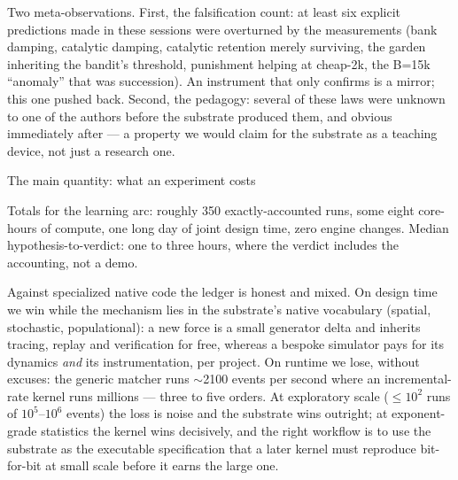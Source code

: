 Two meta-observations. First, the falsification count: at least six
explicit predictions made in these sessions were overturned by the
measurements (bank damping, catalytic damping, catalytic retention
merely surviving, the garden inheriting the bandit's threshold,
punishment helping at cheap-2k, the B=15k ``anomaly'' that was
succession). An instrument that only confirms is a mirror; this one
pushed back. Second, the pedagogy: several of these laws were
unknown to one of the authors before the substrate produced them,
and obvious immediately after --- a property we would claim for the
substrate as a teaching device, not just a research one.

\sec The main quantity: what an experiment costs

\medskip
\noindent{}
\medskip

Totals for the learning arc: roughly 350 exactly-accounted runs,
some eight core-hours of compute, one long day of joint design time,
zero engine changes. Median hypothesis-to-verdict: one to three
hours, where the verdict includes the accounting, not a demo.

Against specialized native code the ledger is honest and mixed. On
design time we win while the mechanism lies in the substrate's
native vocabulary (spatial, stochastic, populational): a new force
is a small generator delta and inherits tracing, replay and
verification for free, whereas a bespoke simulator pays for its
dynamics {\it and} its instrumentation, per project. On runtime we
lose, without excuses: the generic matcher runs $\sim$2100
events per second where an incremental-rate kernel runs millions ---
three to five orders. At exploratory scale ($\le 10^2$ runs of
$10^5$--$10^6$ events) the loss is noise and the substrate wins
outright; at exponent-grade statistics the kernel wins decisively,
and the right workflow is to use the substrate as the executable
specification that a later kernel must reproduce bit-for-bit at
small scale before it earns the large one.

